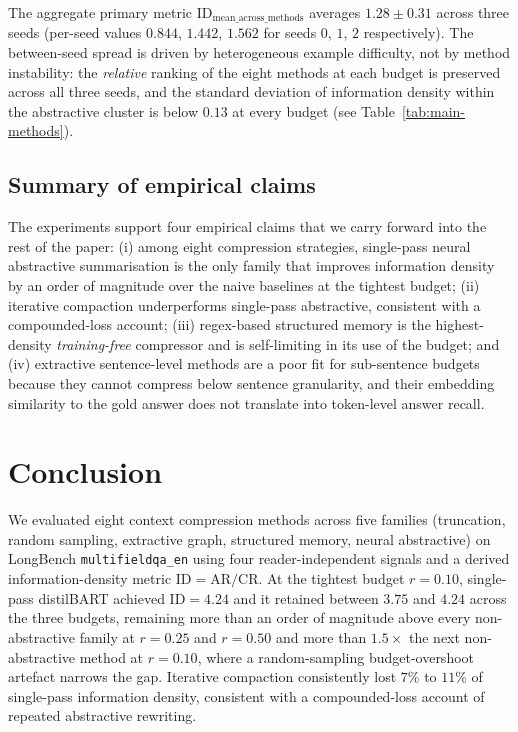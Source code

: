 \documentclass[11pt]{article}
\begin{document}
The aggregate primary metric
$\mathrm{ID}_{\mathrm{mean\_across\_methods}}$ averages $\mathbf{1.28 \pm
0.31}$ across three seeds (per-seed values $0.844$, $1.442$, $1.562$ for
seeds $0$, $1$, $2$ respectively). The between-seed spread is driven by
heterogeneous example difficulty, not by method instability: the
\emph{relative} ranking of the eight methods at each budget is preserved
across all three seeds, and the standard deviation of information density
within the abstractive cluster is below $0.13$ at every budget (see
Table~\ref{tab:main-methods}).

\subsection{Summary of empirical claims}
\label{sec:results-claims}

The experiments support four empirical claims that we carry forward into
the rest of the paper: (i) among eight compression strategies, single-pass
neural abstractive summarisation is the only family that improves
information density by an order of magnitude over the naive baselines at
the tightest budget; (ii) iterative compaction underperforms single-pass
abstractive, consistent with a compounded-loss account; (iii) regex-based
structured memory is the highest-density \emph{training-free} compressor
and is self-limiting in its use of the budget; and (iv) extractive
sentence-level methods are a poor fit for sub-sentence budgets because
they cannot compress below sentence granularity, and their embedding
similarity to the gold answer does not translate into token-level answer
recall.

\section{Conclusion}
\label{sec:conclusion}

We evaluated eight context compression methods across five families
(truncation, random sampling, extractive graph, structured memory,
neural abstractive) on LongBench \texttt{multifieldqa\_en} using four
reader-independent signals and a derived information-density metric
$\mathrm{ID} = \mathrm{AR} / \mathrm{CR}$. At the tightest budget
$r = 0.10$, single-pass distilBART achieved \textbf{$\mathrm{ID} =
4.24$} and it retained between $3.75$ and $4.24$ across the three
budgets, remaining more than an order of magnitude above every
non-abstractive family at $r=0.25$ and $r=0.50$ and more than
$1.5\times$ the next non-abstractive method at $r=0.10$, where a
random-sampling budget-overshoot artefact narrows the gap. Iterative compaction consistently lost $7\%$ to $11\%$ of
single-pass information density, consistent with a compounded-loss
account of repeated abstractive rewriting.
\end{document}
